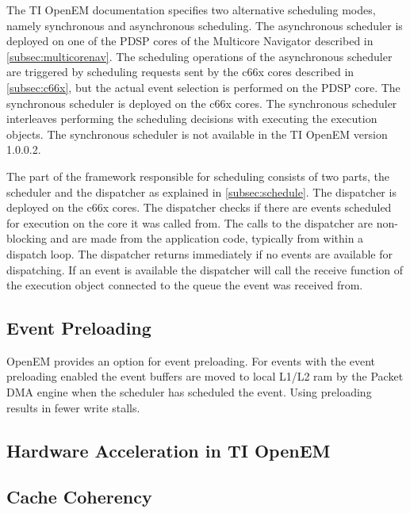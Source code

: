The TI OpenEM documentation specifies two alternative scheduling modes, namely synchronous and asynchronous scheduling. The asynchronous scheduler is deployed on one of the PDSP cores of the Multicore Navigator described in \ref{subsec:multicorenav}. The scheduling operations of the asynchronous scheduler are triggered by scheduling requests sent by the c66x cores described in \ref{subsec:c66x}, but the actual event selection is performed on the PDSP core. The synchronous scheduler is deployed on the c66x cores. The synchronous scheduler interleaves performing the scheduling decisions with executing the execution objects. The synchronous scheduler is not available in the TI OpenEM version 1.0.0.2.~\cite{openemwhite}

The part of the framework responsible for scheduling consists of two parts, the scheduler and the dispatcher as explained in \ref{subsec:schedule}. The dispatcher is deployed on the c66x cores. The dispatcher checks if there are events scheduled for execution on the core it was called from. The calls to the dispatcher are non-blocking and are made from the application code, typically from within a dispatch loop. The dispatcher returns immediately if no events are available for dispatching. If an event is available the dispatcher will call the receive function of the execution object connected to the queue the event was received from.~\cite{openemwhite}

\subsection{Event Preloading}
\label{subsec:ti-preloading}
OpenEM provides an option for event preloading. For events with the event preloading enabled the event buffers are moved to local L1/L2 ram by the Packet DMA engine  when the scheduler has scheduled the event. Using preloading results in fewer write stalls. \cite{openemwhite}  

\subsection{Hardware Acceleration in TI OpenEM}
\label{subsec:ti-acceleration}

\subsection{Cache Coherency}
\label{subsec:ti-cache-coherency}

